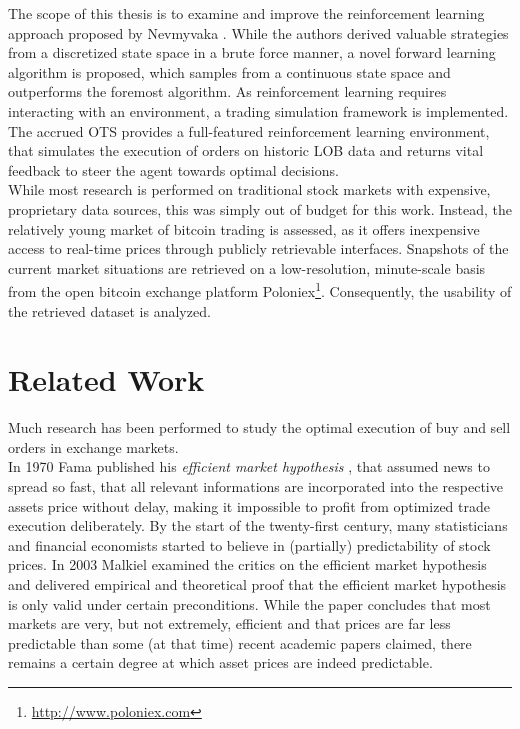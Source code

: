 The scope of this thesis is to examine and improve the reinforcement learning approach proposed by Nevmyvaka \etal\cite{Nevmyvaka:2006}. While the authors derived valuable strategies from a discretized state space in a brute force manner, a novel forward learning algorithm is proposed, which samples from a continuous state space and outperforms the foremost algorithm. As reinforcement learning requires interacting with an environment, a trading simulation framework is implemented. The accrued \acf{OTS} provides a full-featured reinforcement learning environment, that simulates the execution of orders on historic \ac{LOB} data and returns vital feedback to steer the agent towards optimal decisions.\\

While most research is performed on traditional stock markets with expensive, proprietary data sources, this was simply out of budget for this work. Instead, the relatively young market of bitcoin trading is assessed, as it offers inexpensive access to real-time prices through publicly retrievable interfaces. Snapshots of the current market situations are retrieved on a low-resolution, minute-scale basis from the open bitcoin exchange platform Poloniex\footnote{\url{http://www.poloniex.com}}. Consequently, the usability of the retrieved dataset is analyzed.



\section{Related Work}
\label{sec:relatedwork}
Much research has been performed to study the optimal execution of buy and sell orders in exchange markets.\\

In 1970 Fama published his \emph{efficient market hypothesis} \Cite{Fama70efficientcapital}, that assumed news to spread so fast, that all relevant informations are incorporated into the respective assets price without delay, making it impossible to profit from optimized trade execution deliberately. By the start of the twenty-first century, many statisticians and financial economists started to believe in (partially) predictability of stock prices. In 2003 Malkiel \Cite{TheEfficentMarketHypothesisAndItsCritics} examined the critics on the efficient market hypothesis and delivered empirical and theoretical proof that the efficient market hypothesis is only valid under certain preconditions. While the paper concludes that most markets are very, but not extremely, efficient and that prices are far less predictable than some (at that time) recent academic papers claimed, there remains a certain degree at which asset prices are indeed predictable.\\

